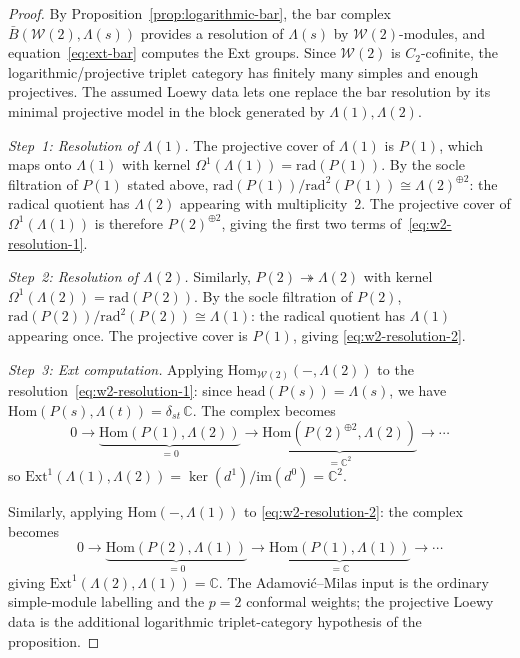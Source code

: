 \begin{proof}
By Proposition~\ref{prop:logarithmic-bar}, the bar complex
$\bar{B}(\mathcal{W}(2), \Lambda(s))$ provides a resolution of
$\Lambda(s)$ by $\mathcal{W}(2)$-modules, and
equation~\eqref{eq:ext-bar} computes the Ext groups. Since
$\mathcal{W}(2)$ is $C_2$-cofinite, the logarithmic/projective
triplet category has finitely many simples and enough projectives.
The assumed Loewy data lets one replace the bar resolution by its
minimal projective model in the block generated by
$\Lambda(1),\Lambda(2)$.

\emph{Step~1: Resolution of $\Lambda(1)$.}
The projective cover of $\Lambda(1)$ is $P(1)$, which maps
onto $\Lambda(1)$ with kernel
$\Omega^1(\Lambda(1)) = \mathrm{rad}(P(1))$. By the socle
filtration of $P(1)$ stated above,
$\mathrm{rad}(P(1))/\mathrm{rad}^2(P(1)) \cong
\Lambda(2)^{\oplus 2}$: the radical quotient has $\Lambda(2)$
appearing with multiplicity~$2$. The projective cover of
$\Omega^1(\Lambda(1))$ is therefore $P(2)^{\oplus 2}$, giving
the first two terms of~\eqref{eq:w2-resolution-1}.

\emph{Step~2: Resolution of $\Lambda(2)$.}
Similarly, $P(2) \twoheadrightarrow \Lambda(2)$ with kernel
$\Omega^1(\Lambda(2)) = \mathrm{rad}(P(2))$. By the socle
filtration of $P(2)$,
$\mathrm{rad}(P(2))/\mathrm{rad}^2(P(2)) \cong \Lambda(1)$:
the radical quotient has $\Lambda(1)$ appearing once. The
projective cover is $P(1)$, giving
\eqref{eq:w2-resolution-2}.

\emph{Step~3: Ext computation.}
Applying $\mathrm{Hom}_{\mathcal{W}(2)}(-, \Lambda(2))$ to the
resolution~\eqref{eq:w2-resolution-1}: since
$\mathrm{head}(P(s)) = \Lambda(s)$, we have
$\mathrm{Hom}(P(s), \Lambda(t)) = \delta_{st}\,\mathbb{C}$.
The complex becomes
\[
0 \to \underbrace{\mathrm{Hom}(P(1), \Lambda(2))}_{= 0}
\to \underbrace{\mathrm{Hom}(P(2)^{\oplus 2}, \Lambda(2))}_{= \mathbb{C}^2}
\to \cdots
\]
so $\mathrm{Ext}^1(\Lambda(1), \Lambda(2))
= \ker(d^1)/\mathrm{im}(d^0) = \mathbb{C}^2$.

Similarly, applying $\mathrm{Hom}(-, \Lambda(1))$ to
\eqref{eq:w2-resolution-2}: the complex becomes
\[
0 \to \underbrace{\mathrm{Hom}(P(2), \Lambda(1))}_{= 0}
\to \underbrace{\mathrm{Hom}(P(1), \Lambda(1))}_{= \mathbb{C}}
\to \cdots
\]
giving $\mathrm{Ext}^1(\Lambda(2), \Lambda(1)) = \mathbb{C}$.
The Adamovi\'c--Milas input is the ordinary simple-module
labelling and the $p=2$ conformal weights; the projective Loewy data
is the additional logarithmic triplet-category hypothesis of the
proposition.
\end{proof}

